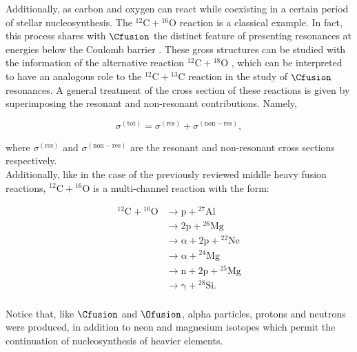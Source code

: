 \documentclass[openany]{book}
\begin{document}
Additionally, as carbon and oxygen can react while coexisting in a certain period of stellar nucleosynthesis. The $\mathrm{{}^{12}C + {}^{16}O}$ reaction is a classical example. In fact, this process shares with $\Cfusion$ the distinct feature of presenting resonances at energies below the Coulomb barrier \cite{torilov_maltsev_zherebchevsky_2021}. These gross structures can be studied with the information of the alternative reaction $\mathrm{{}^{12}C + {}^{18}O}$ \cite{chan_bohn_vandenbosch_sielemann_cramer_bernhardt_bhang_chiang_1979}, which can be interpreted to have an analogous role to the $\mathrm{{}^{12}C + {}^{13}C}$ reaction in the study of $\Cfusion$ resonances. A general treatment of the cross section of these reactions is given by 
superimposing the resonant and non-resonant contributions. Namely, 

\begin{equation}\label{eq:middleFusion_sumResonantNonResonant}
	\sigma^{(\mathrm{tot})} = \sigma^{(\mathrm{res})} + \sigma^{(\mathrm{non-res})},
\end{equation}

where $\sigma^{(\mathrm{res})}$ and $\sigma^{(\mathrm{non-res})}$ are the resonant and non-resonant cross sections respectively. \\

Additionally, like in the case of the previously reviewed middle heavy fusion reactions, $\mathrm{{}^{12}C + {}^{16}O}$ is a multi-channel reaction with the form:

\begin{equation}\label{eq:middleFusion_experimental_12C18O_channels}
	\begin{split}
		\mathrm{{}^{12}C + {}^{16}O} &\rightarrow \mathrm{p + {}^{27}Al} \\
		&\rightarrow \mathrm{2p + {}^{26}Mg} \\
		&\rightarrow \mathrm{\alpha + 2p + {}^{22}Ne} \\
		&\rightarrow \mathrm{\alpha  + {}^{24}Mg} \\
		&\rightarrow \mathrm{n + 2p + {}^{25}Mg} \\
		&\rightarrow \mathrm{\gamma + {}^{28}Si}. \\
	\end{split}
\end{equation}

Notice that, like $\Cfusion$ and $\Ofusion$, alpha particles, protons and neutrons were produced, in addition to neon and magnesium isotopes which permit the continuation of nucleosynthesis of heavier elements. 
\end{document}
